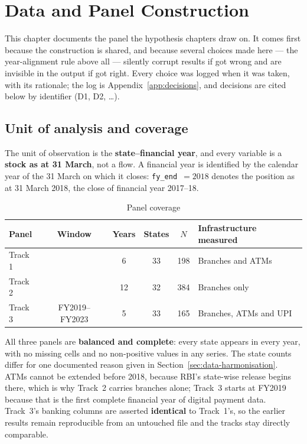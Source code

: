 \chapter{Data and Panel Construction}
\label{ch:data}

This chapter documents the panel the hypothesis chapters draw on. It comes first because the
construction is shared, and because several choices made here --- the year-alignment rule above all
--- silently corrupt results if got wrong and are invisible in the output if got right. Every
choice was logged when it was taken, with its rationale; the log is Appendix~\ref{app:decisions},
and decisions are cited below by identifier (D1, D2, \ldots).

\section{Unit of analysis and coverage}
\label{sec:data-unit}

The unit of observation is the \textbf{state--financial year}, and every variable is a
\textbf{stock as at 31 March}, not a flow. A financial year is identified by the calendar year of
the 31 March on which it closes: \texttt{fy\_end}~$=2018$ denotes the position as at 31 March 2018,
the close of financial year 2017--18.

\begin{table}[H]
\centering
\caption{Panel coverage}
\label{tab:panels}
\small
\begin{tabular}{lccccl}
\toprule
Panel & Window & Years & States & $N$ & Infrastructure measured \\
\midrule
Track 1 & \panelA{} & 6 & 33 & 198 & Branches and ATMs \\
Track 2 & \panelB{} & 12 & 32 & 384 & Branches only \\
Track 3 & FY2019--FY2023 & 5 & 33 & 165 & Branches, ATMs and UPI \\
\bottomrule
\end{tabular}
\end{table}

\noindent
All three panels are \textbf{balanced and complete}: every state appears in every year, with no
missing cells and no non-positive values in any series. The state counts differ for one documented
reason given in Section~\ref{sec:data-harmonisation}. ATMs cannot be extended before 2018, because
RBI's state-wise release begins there, which is why Track~2 carries branches alone; Track~3 starts
at FY2019 because that is the first complete financial year of digital payment data. Track~3's
banking columns are asserted \textbf{identical} to Track~1's, so the earlier results remain
reproducible from an untouched file and the tracks stay directly comparable.

